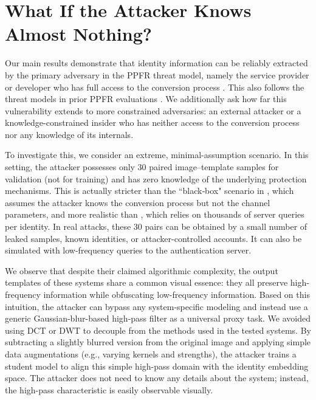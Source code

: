\section{What If the Attacker Knows Almost Nothing?} \label{ref:bb}

Our main results demonstrate that identity information can be reliably extracted by the primary adversary in the PPFR threat model, namely the service provider or developer who has full access to the conversion process \cite{erkin_privacy-preserving_2009}. This also follows the threat models in prior PPFR evaluations \cite{mi_privacy-preserving_2024,mi_privacy-preserving_2023,dai_fracface_2025}. We additionally ask how far this vulnerability extends to more constrained adversaries: an external attacker or a knowledge-constrained insider who has neither access to the conversion process nor any knowledge of its internals.

To investigate this, we consider an extreme, minimal-assumption scenario. In this setting, the attacker possesses only 30 paired image–template samples for validation (not for training) and has zero knowledge of the underlying protection mechanisms. This is actually stricter than the ``black‑box" scenario in \citet{mi_privacy-preserving_2023}, which assumes the attacker knows the conversion process but not the channel parameters, and more realistic than \citet{zhang_validating_2024}, which relies on thousands of server queries per identity. In real attacks, these 30 pairs can be obtained by a small number of leaked samples, known identities, or attacker-controlled accounts. It can also be simulated with low-frequency queries to the authentication server.

We observe that despite their claimed algorithmic complexity, the output templates of these systems share a common visual essence: they all preserve high-frequency information while obfuscating low-frequency information. Based on this intuition, the attacker can bypass any system-specific modeling and instead use a generic Gaussian-blur-based high-pass filter as a universal proxy task. We avoided using DCT or DWT to decouple from the methods used in the tested systems. By subtracting a slightly blurred version from the original image and applying simple data augmentations (e.g., varying kernels and strengths), the attacker trains a student model to align this simple high-pass domain with the identity embedding space. The attacker does not need to know any details about the system; instead, the high-pass characteristic is easily observable visually.

